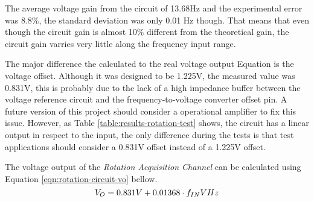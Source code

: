 		The average voltage gain from the circuit of 13.68Hz and the experimental error was 8.8$\%$, the standard deviation was only 0.01 Hz though. That means that even though the circuit gain is almost 10$\%$ different from the theoretical gain, the circuit gain varries very little along the frequency input range.
		\par
		The major difference the calculated to the real voltage output Equation is the voltage offset. Although it was designed to be 1.225V, the measured value was 0.831V, this is probably due to the lack of a high impedance buffer between the voltage reference circuit and the frequency-to-voltage converter offset pin. A future version of this project should consider a operational amplifier to fix this issue. However, as Table \ref{table:results-rotation-test} shows, the circuit has a linear output in respect to the input, the only difference during the tests is that test applications should consider a 0.831V offset instead of a 1.225V offset.
		\par
		The voltage output of the \textit{Rotation Acquisition Channel} can be calculated using Equation \ref{eqn:rotation-circuit-vo} bellow.
			\begin{equation}\label{eqn:rotation-theoretical-vo}

				V_{O}=0.831V + 0.01368 \cdot f_{IN}   V\/Hz
			\end{equation}